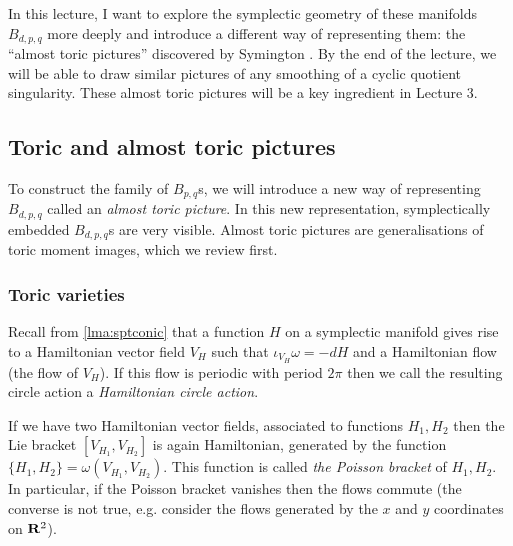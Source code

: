 \documentclass{article}
\begin{document}
In this lecture, I want to explore the symplectic geometry of these
manifolds \(B_{d,p,q}\) more deeply and introduce a different way of
representing them: the ``almost toric pictures'' discovered by
Symington \cite{Symington}. By the end of the lecture, we will be able
to draw similar pictures of any smoothing of a cyclic quotient
singularity. These almost toric pictures will be a key ingredient in
Lecture 3.


\subsection{Toric and almost toric pictures}


To construct the family of \(B_{p,q}\)s, we will introduce a new way
of representing \(B_{d,p,q}\) called an {\em almost toric picture}. In
this new representation, symplectically embedded \(B_{d,p,q}\)s are
very visible. Almost toric pictures are generalisations of toric
moment images, which we review first.


\subsubsection{Toric varieties}


Recall from \cref{lma:sptconic} that a function \(H\) on a symplectic
manifold gives rise to a Hamiltonian vector field \(V_H\) such that
\(\iota_{V_H}\omega=-dH\) and a Hamiltonian flow (the flow of
\(V_H\)). If this flow is periodic with period \(2\pi\) then we call
the resulting circle action a {\em Hamiltonian circle action}.


If we have two Hamiltonian vector fields, associated to functions
\(H_1,H_2\) then the Lie bracket \([V_{H_1},V_{H_2}]\) is again
Hamiltonian, generated by the function
\(\{H_1,H_2\}=\omega(V_{H_1},V_{H_2})\). This function is called {\em
the Poisson bracket} of \(H_1,H_2\). In particular, if the Poisson
bracket vanishes then the flows commute (the converse is not true,
e.g. consider the flows generated by the \(x\) and \(y\) coordinates
on \(\mathbf{R}^2\)).
\end{document}
